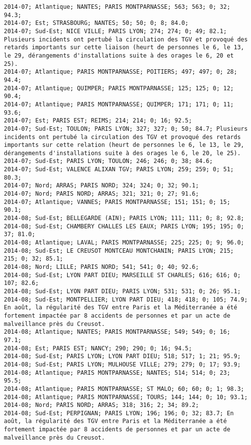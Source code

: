 \documentclass{article}
\begin{document}
\begin{Verbatim}[commandchars=\\\{\}]
2014-07; Atlantique; NANTES; PARIS MONTPARNASSE; 563; 563; 0; 32; 94.3; 
2014-07; Est; STRASBOURG; NANTES; 50; 50; 0; 8; 84.0; 
2014-07; Sud-Est; NICE VILLE; PARIS LYON; 274; 274; 0; 49; 82.1; Plusieurs incidents ont pertubé la circulation des TGV et provoqué des retards importants sur cette liaison (heurt de personnes le 6, le 13, le 29, dérangements d'installations suite à des orages le 6, 20 et 25).
2014-07; Atlantique; PARIS MONTPARNASSE; POITIERS; 497; 497; 0; 28; 94.4; 
2014-07; Atlantique; QUIMPER; PARIS MONTPARNASSE; 125; 125; 0; 12; 90.4; 
2014-07; Atlantique; PARIS MONTPARNASSE; QUIMPER; 171; 171; 0; 11; 93.6; 
2014-07; Est; PARIS EST; REIMS; 214; 214; 0; 16; 92.5; 
2014-07; Sud-Est; TOULON; PARIS LYON; 327; 327; 0; 50; 84.7; Plusieurs incidents ont pertubé la circulation des TGV et provoqué des retards importants sur cette relation (heurt de personnes le 6, le 13, le 29, dérangements d'installations suite à des orages le 6, le 20, le 25).
2014-07; Sud-Est; PARIS LYON; TOULON; 246; 246; 0; 38; 84.6; 
2014-07; Sud-Est; VALENCE ALIXAN TGV; PARIS LYON; 259; 259; 0; 51; 80.3; 
2014-07; Nord; ARRAS; PARIS NORD; 324; 324; 0; 32; 90.1; 
2014-07; Nord; PARIS NORD; ARRAS; 321; 321; 0; 27; 91.6; 
2014-07; Atlantique; VANNES; PARIS MONTPARNASSE; 151; 151; 0; 15; 90.1; 
2014-08; Sud-Est; BELLEGARDE (AIN); PARIS LYON; 111; 111; 0; 8; 92.8; 
2014-08; Sud-Est; CHAMBERY CHALLES LES EAUX; PARIS LYON; 195; 195; 0; 37; 81.0; 
2014-08; Atlantique; LAVAL; PARIS MONTPARNASSE; 225; 225; 0; 9; 96.0; 
2014-08; Sud-Est; LE CREUSOT MONTCEAU MONTCHANIN; PARIS LYON; 215; 215; 0; 32; 85.1; 
2014-08; Nord; LILLE; PARIS NORD; 541; 541; 0; 40; 92.6; 
2014-08; Sud-Est; LYON PART DIEU; MARSEILLE ST CHARLES; 616; 616; 0; 107; 82.6; 
2014-08; Sud-Est; LYON PART DIEU; PARIS LYON; 531; 531; 0; 26; 95.1; 
2014-08; Sud-Est; MONTPELLIER; LYON PART DIEU; 418; 418; 0; 105; 74.9; En août, la régularité des TGV entre Paris et la Méditerranée a été fortement impactée par 8 accidents de personnes et par un acte de malveillance près du Creusot.
2014-08; Atlantique; NANTES; PARIS MONTPARNASSE; 549; 549; 0; 16; 97.1; 
2014-08; Est; PARIS EST; NANCY; 290; 290; 0; 16; 94.5; 
2014-08; Sud-Est; PARIS LYON; LYON PART DIEU; 518; 517; 1; 21; 95.9; 
2014-08; Sud-Est; PARIS LYON; MULHOUSE VILLE; 279; 279; 0; 17; 93.9; 
2014-08; Atlantique; PARIS MONTPARNASSE; NANTES; 514; 514; 0; 23; 95.5; 
2014-08; Atlantique; PARIS MONTPARNASSE; ST MALO; 60; 60; 0; 1; 98.3; 
2014-08; Atlantique; PARIS MONTPARNASSE; TOURS; 144; 144; 0; 10; 93.1; 
2014-08; Nord; PARIS NORD; ARRAS; 318; 316; 2; 34; 89.2; 
2014-08; Sud-Est; PERPIGNAN; PARIS LYON; 196; 196; 0; 32; 83.7; En août, la régularité des TGV entre Paris et la Méditerranée a été fortement impactée par 8 accidents de personnes et par un acte de malveillance près du Creusot.

\end{Verbatim}
\end{document}
